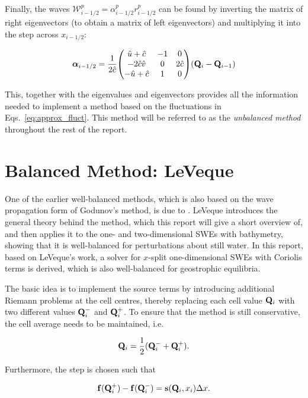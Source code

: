 Finally, the waves $\mathcal{W}_{i-1/2}^p = \alpha_{i-1/2}^p r_{i-1/2}^p$ can be found by inverting the matrix of right eigenvectors (to obtain a matrix of left eigenvectors) and multiplying it into the step across $x_{i-1/2}$:

\begin{equation}
  \vb*{\alpha}_{i-1/2} = \frac{1}{2\hat c}\mqty(
    \hat u + \hat c & -1 & 0 \\
    -2\hat c \hat v &  0 & 2\hat c \\
    -\hat u + \hat c & 1 & 0
  ) (\vb Q_i - \vb Q_{i-1})
\end{equation}

This, together with the eigenvalues and eigenvectors provides all the information needed to implement a method based on the fluctuations in Eqs.~\ref{eq:approx_fluct}. This method will be referred to as the \emph{unbalanced method} throughout the rest of the report.

\section{Balanced Method: LeVeque}

One of the earlier well-balanced methods, which is also based on the wave propagation form of Godunov's method, is due to \citet{leveque1998balancing}. LeVeque introduces the general theory behind the method, which this report will give a short overview of, and then applies it to the one- and two-dimensional SWEs with bathymetry, showing that it is well-balanced for perturbations about still water. In this report, based on LeVeque's work, a solver for $x$-split one-dimensional SWEs with Coriolis terms is derived, which is also well-balanced for geostrophic equilibria.

The basic idea is to implement the source terms by introducing additional Riemann problems at the cell centres, thereby replacing each cell value $\vb Q_i$ with two different values $\vb Q_i^-$ and $\vb Q_i^+$. To ensure that the method is still conservative, the cell average needs to be maintained, i.e.

\begin{equation}
  \label{eq:leveque_avg_condition}
  \vb Q_i = \frac{1}{2}(\vb Q_i^- + \vb Q_i^+).
\end{equation}

Furthermore, the step is chosen such that

\begin{equation}
  \label{eq:leveque_step_condition}
  \vb f(\vb Q_i^+) - \vb f(\vb Q_i^-) = \vb s(\vb Q_i, x_i) \Delta x.
\end{equation}


